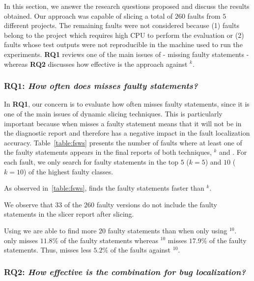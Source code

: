 \documentclass{article}
\begin{document}
In this section, we answer the research questions proposed and discuss the
results obtained. Our approach was capable of slicing a total of $260$ faults
from $5$ different  projects. The remaining faults were not considered because
(1) faults belong to the \closure{} project which requires high CPU to perform
the  evaluation  or (2) faults whose test outputs were not
reproducible in the machine used to run the experiments. \textbf{RQ1} reviews
one of the main issues of \ds{} - missing faulty statements - whereas
\textbf{RQ2} discusses how effective is the  approach against
\sfl{}$^{k}$.

\subsubsection{RQ1: \textit{How often does \ds{} misses faulty statements?}}
\label{sec:fault-misses}

In \textbf{RQ1}, our concern is to evaluate how often \ds{} misses faulty
statements,  since it is one of the main issues of dynamic slicing techniques. This
is particularly important because when \ds{} misses a faulty statement
means that it will not be in the diagnostic report and therefore has a negative
impact in the fault localization accuracy. Table~\ref{table:fsws}  presents the
number of faults where at least one of the faulty statements appears  in the
final reports of both techniques, \sfl{}$^{k}$ and . For each fault,
we  only search for faulty statements in the top $5$ ($k=5$) and $10$ ($k=10$)
of the highest faulty  classes.


As observed in~\ref{table:fsws}, 
finds the faulty statements faster than \sfl{}$^{k}$.

We observe that $33$ of the $260$ faulty versions do not include the
faulty statements in the slicer report after slicing.


Using  we are able to find more $20$ faulty
statements than when only using \sfl{}$^{10}$.  only misses $11.8\%$
of the faulty statements whereas \sfl{}$^{10}$ misses $17.9\%$ of the faulty
statements. Thus,  misses less $5.2\%$ of the faults against
\sfl{}$^{10}$.

\subsubsection{RQ2: \textit{How effective is the  combination for bug localization?}}
\end{document}
